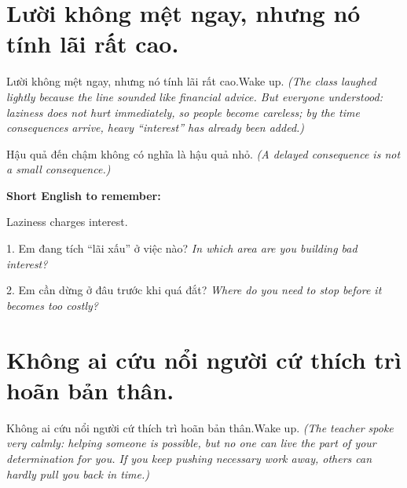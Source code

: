 \section{Lười không mệt ngay, nhưng nó tính lãi rất cao.}
\begin{truyen}{Lười không mệt ngay, nhưng nó tính lãi rất cao.}{Wake up.}
\textit{(The class laughed lightly because the line sounded like financial advice. But everyone understood: laziness does not hurt immediately, so people become careless; by the time consequences arrive, heavy “interest” has already been added.)}
\end{truyen}

\begin{baihoc}
Hậu quả đến chậm không có nghĩa là hậu quả nhỏ.
\textit{(A delayed consequence is not a small consequence.)}
\end{baihoc}

\begin{ghinhoanh}
\textbf{Short English to remember:}

Laziness charges interest.

\end{ghinhoanh}

\begin{tuhocnhanh}
1. Em đang tích “lãi xấu” ở việc nào? \textit{In which area are you building bad interest?}

2. Em cần dừng ở đâu trước khi quá đắt? \textit{Where do you need to stop before it becomes too costly?}
\end{tuhocnhanh}
\ngancach

\section{Không ai cứu nổi người cứ thích trì hoãn bản thân.}
\begin{truyen}{Không ai cứu nổi người cứ thích trì hoãn bản thân.}{Wake up.}
\textit{(The teacher spoke very calmly: helping someone is possible, but no one can live the part of your determination for you. If you keep pushing necessary work away, others can hardly pull you back in time.)}
\end{truyen}

